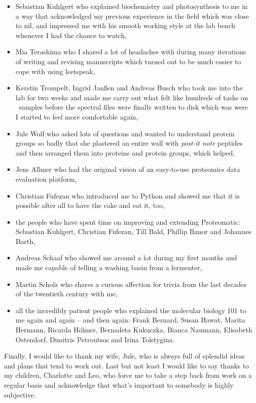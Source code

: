\begin{itemize}
\item
Sebastian Kuhlgert who explained biochemistry and photosynthesis to me in a 
way that acknowledged my previous experience in the field which was close to 
nil, and impressed me with his smooth working style at the lab bench
whenever I had the chance to watch,

\item
Mia Terashima who I shared a lot of headaches with during many iterations of 
writing and revising manuscripts which turned out to be much easier to cope
with using leetspeak,

\item
Kerstin Trompelt, Ingrid Janßen and Andreas Busch who took me into the lab for
two weeks and made me carry out what felt like hundreds of tasks on \cre~samples 
before the spectral files were finally written to disk which was were I started
to feel more comfortable again,

\item
Jule Wolf who asked lots of questions and wanted to understand protein groups so 
badly that she plastered an entire wall with {\em post-it note} peptides and then
arranged them into proteins and protein groups, which helped,

\item
Jens Allmer who had the original vision of an easy-to-use proteomics data evaluation 
platform,

\item Christian Fufezan who introduced me to Python and showed me that it is possible 
after all to have the cake and eat it, too,

\item
the people who have spent time on improving and extending Proteomatic:
Sebastian Kuhlgert, Christian Fufezan, Till Bald, Phillip Ihmor and Johannes Barth,

\item
Andreas Schaaf who showed me around a lot during my first months and made me 
capable of telling a washing basin from a fermenter,

\item
Martin Scholz who shares a curious affection for trivia from the last decades of 
the twentieth century with me,

\item
all the incredibly patient people who explained the molecular biology 101 to me 
again and again -- and then again:
Frank Bernard,
Susan Hawat,
Marita Hermann,
Ricarda Höhner,
Bernadeta Kukuczka,
Bianca Naumann, 
Elisabeth Ostendorf,
Dimitris Petroutsos and Irina Tolstygina.

\end{itemize}

Finally, I would like to thank my wife, Jule, who is always full of splendid ideas
and plans that tend to work out.
Last but not least I would like to say thanks to my children, Charlotte and Leo, 
who force me to take a step back from work on a regular basis and acknowledge that 
what's important to somebody is highly subjective.
